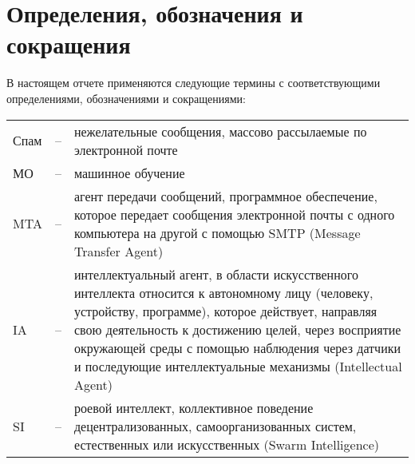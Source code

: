 \chapter*{Определения, обозначения и сокращения}

В настоящем отчете применяются следующие термины с соответствующими определениями, 
обозначениями и сокращениями:

\begin{table}[ht]
    \begin{tabular}{ p{} p{} p{} } 
        Спам & -- & нежелательные сообщения, массово рассылаемые по электронной почте \\
        МО & -- & машинное обучение \\
        MTA & -- & агент передачи сообщений, программное обеспечение, которое передает сообщения электронной почты с одного компьютера на другой с помощью SMTP (Message Transfer Agent) \\
        IA & -- & интеллектуальный агент, в области искусственного интеллекта 
        относится к автономному лицу (человеку, устройству, программе), которое 
        действует, направляя свою деятельность к достижению целей, через 
        восприятие окружающей среды с помощью наблюдения через датчики и 
        последующие интеллектуальные механизмы (Intellectual Agent) \\
        SI & -- & роевой интеллект, коллективное поведение 
        децентрализованных, самоорганизованных систем, естественных или 
        искусственных (Swarm Intelligence)
    \end{tabular} 
\end{table}